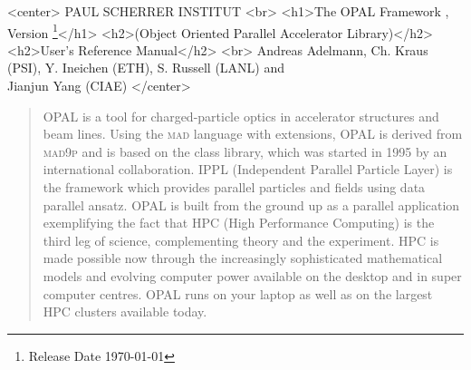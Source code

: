 \documentclass[12pt,a4paper]{report}
\newcommand{\opalversion}{\text{1.1.5 }}
\newcommand{\mad}{\textsc{mad }}
\newcommand{\madninep}{\textsc{mad9p }}
\newcommand{\opal}{\textsc{OPAL }}
\begin{document}
\begin{titlepage}

\begin{htmlonly}
\begin{rawhtml}
<center>
PAUL SCHERRER INSTITUT
<br>
<h1>The OPAL Framework , Version \opalversion \footnote{Release Date \today}</h1>
<h2>(Object Oriented Parallel Accelerator Library)</h2>
<h2>User's Reference Manual</h2>
<br>
Andreas Adelmann, Ch. Kraus (PSI), Y. Ineichen (ETH), S. Russell (LANL) and \\ Jianjun Yang (CIAE)
</center>
\end{rawhtml}
\end{htmlonly}

\begin{quotation}
\opal is a tool for charged-particle optics in
accelerator structures and beam lines. 
Using the \mad language with extensions, \opal is derived from \madninep and is based 
on the
 class library,
which was started in 1995 by an international collaboration.  IPPL (Independent Parallel Particle Layer) is
the framework which provides parallel particles and fields using data parallel ansatz. 
\opal is built from the ground up as a parallel application exemplifying the fact that HPC (High Performance Computing) 
is the third leg of science, complementing theory and the experiment. 
HPC is made possible now through the increasingly sophisticated mathematical models and evolving computer power available on the desktop
and in super computer centres. \opal runs on your laptop as well as on the largest HPC clusters available today.


\end{quotation}
\end{titlepage}
\end{document}
